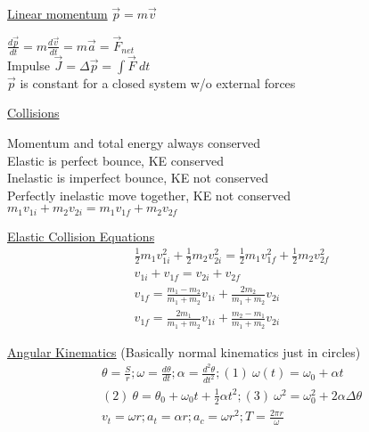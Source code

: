 \documentclass[8pt]{minimal}
\begin{document}
\underline{Linear momentum} $\vec{p} = m\vec{v}$

$\frac{d\vec{p}}{dt} = m\frac{d\vec{v}}{dt} = m\vec{a} = \vec{F}_{net}$\\
Impulse $\vec{J} = \Delta \vec{p} = \int \vec{F}\ dt$\\
$\vec{p}$ is constant for a closed system w/o external forces

\underline{Collisions}

Momentum and total energy always conserved\\
Elastic is perfect bounce, KE conserved\\
Inelastic is imperfect bounce, KE not conserved\\
Perfectly inelastic move together, KE not conserved
$m_1v_{1i} + m_2v_{2i} = m_1v_{1f} + m_2v_{2f}$

\pagebreak
\underline{Elastic Collision Equations}
\begin{gather*}
    \frac{1}{2}m_1v_{1i}^2 + \frac{1}{2}m_2v_{2i}^2 = \frac{1}{2}m_1v_{1f}^2 + \frac{1}{2}m_2v_{2f}^2\\
    v_{1i} + v_{1f} = v_{2i} + v_{2f}\\
    v_{1f} = \frac{m_1 - m_2}{m_1 + m_2}v_{1i} + \frac{2m_2}{m_1 + m_2}v_{2i}\\
    v_{1f} = \frac{2m_1}{m_1 + m_2}v_{1i} + \frac{m_2 - m_1}{m_1 + m_2}v_{2i}
\end{gather*}

\underline{Angular Kinematics}
(Basically normal kinematics just in circles)
\begin{gather*}
    \theta = \frac{S}{r}; \omega = \frac{d\theta}{dt}; \alpha = \frac{d^2\theta}{dt^2}; (1)\ \omega(t) = \omega_0 + \alpha t\\
    (2)\ \theta = \theta_0 + \omega_0t + \frac{1}{2}\alpha t^2; (3)\ \omega^2 = \omega_0^2 + 2\alpha\Delta\theta\\
    v_t = \omega r; a_t = \alpha r; a_c = \omega r^2; T = \frac{2 \pi r}{\omega}
\end{gather*}
\end{document}

